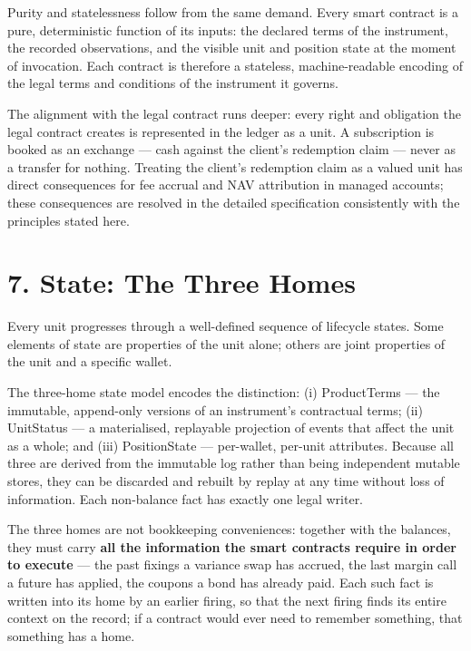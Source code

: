 \documentclass[11pt,a4paper]{article}
\begin{document}
Purity and statelessness follow from the same demand. Every smart
contract is a pure, deterministic function of its inputs: the declared
terms of the instrument, the recorded observations, and the visible unit
and position state at the moment of invocation. Each contract is
therefore a stateless, machine-readable encoding of the legal terms and
conditions of the instrument it governs.

The alignment with the legal contract runs deeper: every right and
obligation the legal contract creates is represented in the ledger as a
unit. A subscription is booked as an exchange --- cash against the
client's redemption claim --- never as a transfer for nothing. Treating
the client's redemption claim as a valued unit has direct consequences
for fee accrual and NAV attribution in managed accounts; these
consequences are resolved in the detailed specification consistently
with the principles stated here.

\hypertarget{state-the-three-homes}{%
\section{7. State: The Three Homes}\label{state-the-three-homes}}

Every unit progresses through a well-defined sequence of lifecycle
states. Some elements of state are properties of the unit alone; others
are joint properties of the unit and a specific wallet.

The three-home state model encodes the distinction: (i) ProductTerms ---
the immutable, append-only versions of an instrument's contractual
terms; (ii) UnitStatus --- a materialised, replayable projection of
events that affect the unit as a whole; and (iii) PositionState ---
per-wallet, per-unit attributes. Because all three are derived from the
immutable log rather than being independent mutable stores, they can be
discarded and rebuilt by replay at any time without loss of information.
Each non-balance fact has exactly one legal writer.

The three homes are not bookkeeping conveniences: together with the
balances, they must carry \textbf{all the information the smart
contracts require in order to execute} --- the past fixings a variance
swap has accrued, the last margin call a future has applied, the coupons
a bond has already paid. Each such fact is written into its home by an
earlier firing, so that the next firing finds its entire context on the
record; if a contract would ever need to remember something, that
something has a home.
\end{document}
